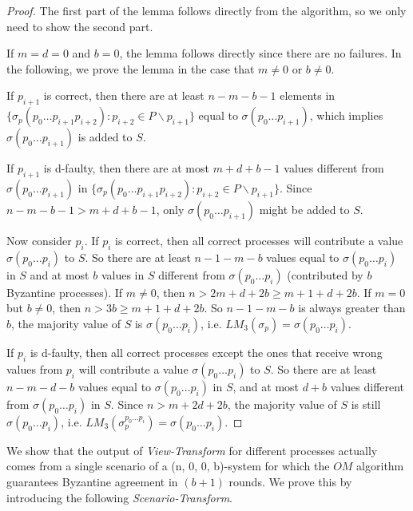 \documentclass[11pt,conference,compsoc,onecolumn,romanappendices]{IEEEtran}
\newcommand{\tmem}[1]{{\em #1\/}}
\begin{document}
\begin{proof}
  The first part of the lemma follows directly from the algorithm,
  so we only need to show the second part.

  If $m = d = 0$ and $b = 0$, the lemma follows directly since there are no
  failures. In the following, we prove the lemma in the case that $m \neq 0$ or $b
  \neq 0$.


  If $p_{i + 1}$ is correct,  then there are at
  least $n - m - b - 1$ elements in $\{
  \sigma_p (p_0 \ldots p_{i + 1} p_{i + 2}) : {p_{i + 2} \in P \backslash p_{i + 1}}\}$
  equal to $\sigma (p_0 \ldots p_{i + 1})$,
  which implies $\sigma (p_0 \ldots p_{i + 1})$ is added to $S$.
  
  If $p_{i + 1}$ is d-faulty, then there are at most
  $m + d + b - 1$ values different from $\sigma (p_0 \ldots p_{i + 1})$ in $\{
  \sigma_p (p_0 \ldots p_{i + 1} p_{i + 2}) : {p_{i + 2} \in P \backslash p_{i + 1}} \}$.
  Since $n - m - b - 1 > m + d + b - 1$, only $\sigma (p_0 \ldots p_{i
  + 1})$ might be added to $S$.
  
  Now consider $p_i$. If $p_i$ is correct,
  then all correct processes
  will contribute a value $\sigma (p_0 \ldots p_i)$ to $S$. So there
  are at least $n - 1 - m - b$ values equal to $\sigma (p_0 \ldots p_i)$ in
  $S$ and at most $b$ values in $S$ different from $\sigma (p_0 \ldots p_i)$
  (contributed by $b$ Byzantine processes).
  If $m \neq 0$, then $n > 2m + d + 2b \geqslant m+1+d+2b$.
  If $m = 0$ but $b \neq 0$, then $n > 3b \geqslant m+1+d+2b$.
  So $n - 1 - m - b$ is always greater than $b$, the majority
  value of $S$ is $\sigma (p_0 \ldots p_i)$, i.e. $L M_3 (\sigma_p) = \sigma
  (p_0 \ldots p_i)$.
  
  If $p_i$ is d-faulty, then all correct processes
  except the ones that receive wrong values from $p_i$ will contribute a value
  $\sigma (p_0 \ldots p_i)$ to $S$. So there are at least $n - m - d - b$
  values equal to $\sigma (p_0 \ldots p_i)$ in $S$, and at most $d + b$ values
  different from $\sigma (p_0 \ldots p_i)$ in $S$. Since $n > m + 2 d + 2 b$,
  the majority value of $S$ is still $\sigma (p_0 \ldots p_i)$, i.e. $L M_3
  (\sigma_p^{p_0 \ldots p_i}) = \sigma (p_0 \ldots p_i)$.
\end{proof}


We show that the output of \tmem{View-Transform} for different processes
actually comes from a single scenario of a (n, 0, 0, b)-system for which the $O M$
algorithm guarantees Byzantine agreement in $(b+1)$ rounds. We prove this by
introducing the following \tmem{Scenario-Transform}.
\end{document}
